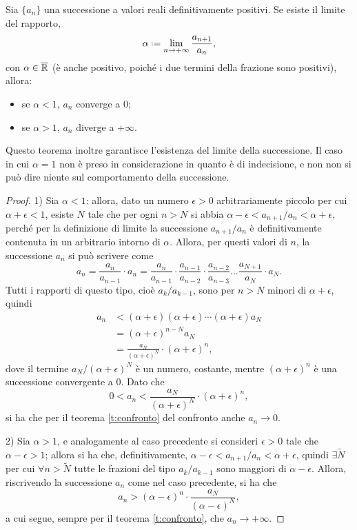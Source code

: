 \begin{teorema}
\label{t:criterio_del_rapporto_successioni}
Sia $\{a_n\}$ una successione a valori reali definitivamente positivi. Se esiste il limite del rapporto,
\[
\alpha\defeq\lim_{n\to +\infty} \frac{a_{n+1}}{a_n},
\]
con $\alpha\in\overline{\mathbb{R}}$ (è anche positivo, poiché i due termini della frazione sono positivi), allora:
\begin{itemize}
	\item se $\alpha<1$, $a_n$ converge a 0;
	\item se $\alpha>1$, $a_n$ diverge a $+\infty$.
\end{itemize}
\end{teorema}
Questo teorema inoltre garantisce l'esistenza del limite della successione. Il caso in cui $\alpha=1$ non è preso in considerazione in quanto è di indecisione, e non non si può dire niente sul comportamento della successione.
\begin{proof}
1) Sia $\alpha<1$: allora, dato un numero $\epsilon>0$ arbitrariamente piccolo per cui $\alpha+\epsilon<1$, esiste $N$ tale che per ogni $n>N$ si abbia $\alpha-\epsilon<a_{n+1}/a_n<\alpha+\epsilon$, perché per la definizione di limite la successione $a_{n+1}/a_n$ è definitivamente contenuta in un arbitrario intorno di $\alpha$. Allora, per questi valori di $n$, la successione $a_n$ si può scrivere come
\[
a_n=\frac{a_n}{a_{n-1}}\cdot a_n=\frac{a_n}{a_{n-1}}\cdot\frac{a_{n-1}}{a_{n-2}}\cdot\frac{a_{n-2}}{a_{n-3}}\dots \frac{a_{N+1}}{a_N}\cdot a_N.
\]
Tutti i rapporti di questo tipo, cioè $a_k/a_{k-1}$, sono per $n>N$ minori di $\alpha+\epsilon$, quindi
\[
\begin{split}
	a_n&<(\alpha+\epsilon)(\alpha+\epsilon)\cdots(\alpha+\epsilon)a_N\\
	&=(\alpha+\epsilon)^{n-N}a_N\\
	&=\frac{a_N}{(\alpha+\epsilon)^N}\cdot (\alpha+\epsilon)^n,
\end{split}
\]
dove il termine $a_N/(\alpha+\epsilon)^N$ è un numero, costante, mentre $(\alpha+\epsilon)^n$ è una successione convergente a 0. Dato che
\[
0<a_n<\frac{a_N}{(\alpha+\epsilon)^N}\cdot (\alpha+\epsilon)^n,
\]
si ha che per il teorema \ref{t:confronto} del confronto anche $a_n\to 0$.

2) Sia $\alpha>1$, e analogamente al caso precedente si consideri $\epsilon>0$ tale che $\alpha-\epsilon>1$; allora si ha che, definitivamente, $\alpha-\epsilon<a_{n+1}/a_n<\alpha+\epsilon$, quindi $\exists\tilde{N}$ per cui $\forall n>\tilde{N}$ tutte le frazioni del tipo $a_k/a_{k-1}$ sono maggiori di $\alpha-\epsilon$. Allora, riscrivendo la successione $a_n$ come nel caso precedente, si ha che
\[
a_n>(\alpha-\epsilon)^n\cdot\frac{a_N}{(\alpha-\epsilon)^N},
\]
a cui segue, sempre per il teorema \ref{t:confronto}, che $a_n\to +\infty$.
\end{proof}

